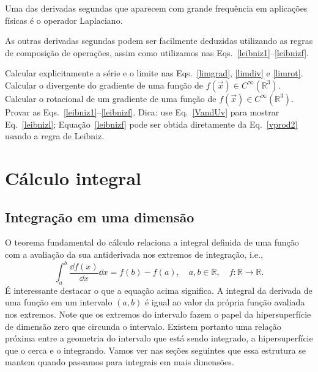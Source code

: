 Uma das derivadas segundas que aparecem com grande frequência em aplicações
físicas é o operador Laplaciano.

As outras derivadas segundas podem ser facilmente deduzidas utilizando as regras de composição de operações, assim como utilizamos nas Eqs.~\eqref{leibniz1}--\eqref{leibnizf}.

\begin{Exercise}[title={Cálculo diferencial}]
	\Question[difficulty=1] Calcular explicitamente a série e o limite nas
	Eqs.~\eqref{limgrad}, \eqref{limdiv} e \eqref{limrot}.
	\Question Calcular o divergente do gradiente de uma função de $f(\vec{x}) \in C^\infty(\mathbb{R}^3)$.
	\Question Calcular o rotacional de um gradiente de uma função de $f(\vec{x}) \in C^\infty(\mathbb{R}^3)$.
	\Question Provar as Eqs.~\eqref{leibniz1}--\eqref{leibnizf}. Dica: use Eq.~\eqref{VandUv} para mostrar Eq.~\eqref{leibnizl}; Equação~\eqref{leibnizf} pode ser obtida diretamente da Eq.~\eqref{vprod2} usando a regra de Leibniz.
\end{Exercise}

\section{Cálculo integral}
\label{sec:int}
\subsection{Integração em uma dimensão}

O teorema fundamental do cálculo relaciona a integral definida de uma função com
a avaliação da sua antiderivada nos extremos de integração, i.e.,
\begin{equation}\label{intdef}
	\int_a^b\frac{\dd f(x)}{\dd x}\dd x  = f(b) - f(a), \quad a,b\in\mathbb{R}, \quad f:\mathbb{R}\to\mathbb{R}.
\end{equation}
É interessante destacar o que a equação acima significa. A integral da derivada
de uma função em um intervalo $(a, b)$ é igual ao valor da própria função
avaliada nos extremos. Note que os extremos do intervalo fazem o papel da
hipersuperfície de dimensão zero que circunda o intervalo. Existem portanto uma
relação próxima entre a geometria do intervalo que está sendo integrado, a
hipersuperfície que o cerca e o integrando. Vamos ver nas seções seguintes que
essa estrutura se mantem quando passamos para integrais em mais dimensões.

